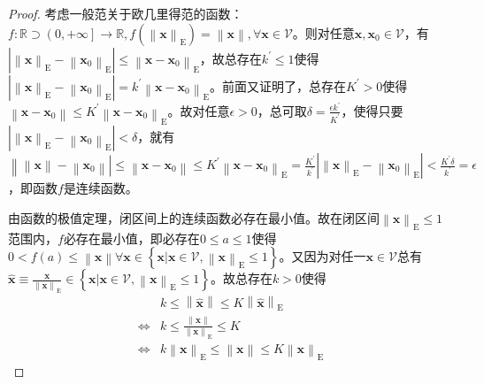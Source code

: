 \documentclass[main.tex]{subfiles}
\begin{document}
\begin{proof}
    考虑一般范关于欧几里得范的函数：$f:\mathbb{R}\supset\left(0,+\infty\right]\rightarrow\mathbb{R},f\left(\left\|\mathbf{x}\right\|_\mathrm{E}\right)=\left\|\mathbf{x}\right\|,\forall\mathbf{x}\in\mathcal{V}$。则对任意$\mathbf{x},\mathbf{x}_0\in\mathcal{V}$，有$\left|\left\|\mathbf{x}\right\|_\mathrm{E}-\left\|\mathbf{x}_0\right\|_\mathrm{E}\right|\leq\left\|\mathbf{x}-\mathbf{x}_0\right\|_\mathrm{E}$，故总存在$k^\prime\leq1$使得$\left|\left\|\mathbf{x}\right\|_\mathrm{E}-\left\|\mathbf{x}_0\right\|_\mathrm{E}\right|=k^\prime\left\|\mathbf{x}-\mathbf{x}_0\right\|_\mathrm{E}$。前面又证明了，总存在$K^\prime>0$使得$\left\|\mathbf{x}-\mathbf{x}_0\right\|\leq K^\prime\left\|\mathbf{x}-\mathbf{x}_0\right\|_\mathrm{E}$。故对任意$\epsilon>0$，总可取$\delta=\frac{\epsilon k^\prime}{K^\prime}$，使得只要$\left|\left\|\mathbf{x}\right\|_\mathrm{E}-\left\|\mathbf{x}_0\right\|_\mathrm{E}\right|<\delta$，就有$\left\|\left\|\mathbf{x}\right\|-\left\|\mathbf{x}_0\right\|\right|\leq\left\|\mathbf{x}-\mathbf{x}_0\right\|\leq K^\prime\left\|\mathbf{x}-\mathbf{x}_0\right\|_\mathrm{E}=\frac{K^\prime}{k^\prime}\left|\left\|\mathbf{x}\right\|_\mathrm{E}-\left\|\mathbf{x}_0\right\|_\mathrm{E}\right|<\frac{K^\prime\delta}{k^\prime}=\epsilon$，即函数$f$是连续函数。

    由函数的极值定理，闭区间上的连续函数必存在最小值。故在闭区间$\left\|\mathbf{x}\right\|_\mathrm{E}\leq 1$范围内，$f$必存在最小值，即必存在$0\leq a\leq 1$使得$0<f\left(a\right)\leq\left\|\mathbf{x}\right\|\forall\mathbf{x}\in\left\{\mathbf{x}|\mathbf{x}\in\mathcal{V},\left\|\mathbf{x}\right\|_\mathrm{E}\leq1\right\}$。又因为对任一$\mathbf{x}\in\mathcal{V}$总有$\mathbf{\hat{x}}\equiv\frac{\mathbf{x}}{\left\|\mathbf{x}\right\|_\mathrm{E}}\in\left\{\mathbf{x}|\mathbf{x}\in\mathcal{V},\left\|\mathbf{x}\right\|_\mathrm{E}\leq1\right\}$。故总存在$k>0$使得
    \begin{align*}
                        & k\leq\left\|\mathbf{\hat{x}}\right\|\leq K\left\|\mathbf{\hat{x}}\right\|_\mathrm{E}                         \\
        \Leftrightarrow & k\leq\frac{\left\|\mathbf{x}\right\|}{\left\|\mathbf{x}\right\|_\mathrm{E}}\leq K                            \\
        \Leftrightarrow & k\left\|\mathbf{x}\right\|_\mathrm{E}\leq\left\|\mathbf{x}\right\|\leq K\left\|\mathbf{x}\right\|_\mathrm{E}
    \end{align*}
\end{proof}
\end{document}
